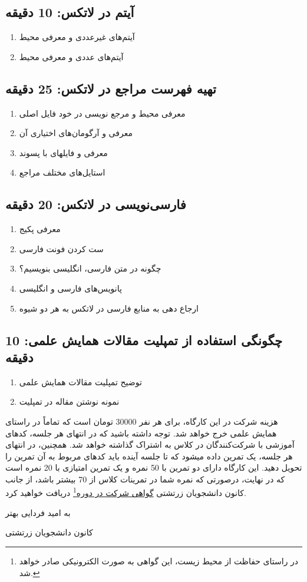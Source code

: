 \documentclass{article}
\begin{document}
\subsection*{آیتم در لاتکس: 10 دقیقه}
\begin{enumerate}
\item آیتم‌های غیرعددی و معرفی محیط 
\item آیتم‌های عددی و معرفی محیط 
\end{enumerate}
\subsection*{تهیه فهرست مراجع در لاتکس: 25 دقیقه}
\begin{enumerate}
\item معرفی محیط  و مرجع نویسی در خود فایل اصلی
\item معرفی  و آرگومان‌های اختیاری آن
\item معرفی  و فایلهای با پسوند 
\item استایل‌های مختلف مراجع
\end{enumerate}
\subsection*{فارسی‌نویسی در لاتکس: 20 دقیقه}
\begin{enumerate}
\item معرفی پکیج 
\item ست کردن فونت‌ فارسی
\item چگونه در متن فارسی، انگلیسی بنویسیم؟
\item پانویس‌های فارسی و انگلیسی
\item ارجاع دهی به منابع فارسی در لاتکس به هر دو شیوه
\end{enumerate}
\subsection*{چگونگی استفاده از تمپلیت مقالات همایش علمی: 10 دقیقه}
\begin{enumerate}
\item  توضیح تمپلیت مقالات همایش علمی
\item نمونه نوشتن مقاله در تمپلیت
\end{enumerate}



\noindent هزینه شرکت در این کارگاه، برای هر نفر 30000 تومان است که تماماً در راستای همایش علمی خرج خواهد شد. توجه داشته باشید که در انتهای هر جلسه، کدهای آموزشی با شرکت‌کنندگان در کلاس به اشتراک گذاشته خواهد شد. همچنین، در انتهای هر جلسه، یک تمرین داده میشود که تا جلسه آینده باید کدهای مربوط به آن تمرین را تحویل دهید. این کارگاه دارای دو تمرین با 50 نمره و یک تمرین امتیازی با 20 نمره است که در نهایت، درصورتی که نمره شما در تمرینات کلاس از 70 بیشتر باشد، از جانب کانون دانشجویان زرتشتی \underline{گواهی شرکت در دوره}\footnote{در راستای حفاظت از محیط زیست، این گواهی به صورت الکترونیکی صادر خواهد شد.} دریافت خواهید کرد. 

\vspace{4cm}
\begin{center}
به امید فردایی بهتر

کانون دانشجویان زرتشتی
\end{center}
\end{document}
